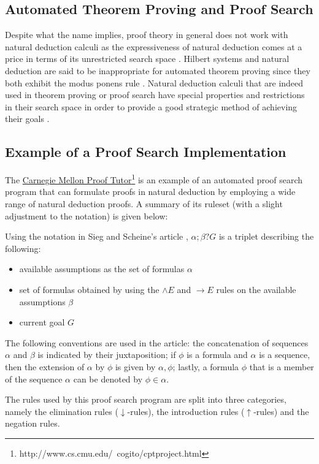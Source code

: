 \documentclass[11pt,twoside,a4paper]{report}
\begin{document}
\subsection{Automated Theorem Proving and Proof Search}
\label{subsec:nnd}
Despite what the name implies, proof theory in general does not work with natural deduction calculi as the expressiveness of natural deduction comes at a price in terms of its unrestricted search space \citep*[pp. 140-141]{siegfried}. Hilbert systems and natural deduction are said to be inappropriate for automated theorem proving since they both exhibit the modus ponens rule \citep*[p. 95]{autobots}. Natural deduction calculi that are indeed used in theorem proving or proof search have special properties and restrictions in their search space in order to provide a good strategic method of achieving their goals \citep*[pp. 140-141]{siegfried}.

\subsection{Example of a Proof Search Implementation}
\label{subsec:carnage}
The \href{http://www.cs.cmu.edu/~cogito/cptproject.html}{Carnegie Mellon Proof Tutor}\footnote{http://www.cs.cmu.edu/~cogito/cptproject.html} is an example of an automated proof search program that can formulate proofs in natural deduction by employing a wide range of natural deduction proofs. A summary of its ruleset (with a slight adjustment to the notation) is given below:

Using the notation in Sieg and Scheine's article \citep{siegfried}, $\alpha;\beta?G$ is a triplet describing the following:
\begin{itemize}
\item
available assumptions as the set of formulas $\alpha$
\item
set of formulas obtained by using the $\wedge E$ and $\rightarrow E$ rules on the available assumptions $\beta$
\item
current goal $G$
\end{itemize}

The following conventions are used in the article: the concatenation of sequences $\alpha$ and $\beta$ is indicated by their juxtaposition; if $\phi$ is a formula and $\alpha$ is a sequence, then the extension of $\alpha$ by $\phi$ is given by $\alpha,\phi$; lastly, a formula $\phi$ that is a member of the sequence $\alpha$ can be denoted by $\phi \in \alpha$.

The rules used by this proof search program are split into three categories, namely the elimination rules ($\downarrow$-rules), the introduction rules ($\uparrow$-rules) and the negation rules. 
\end{document}

